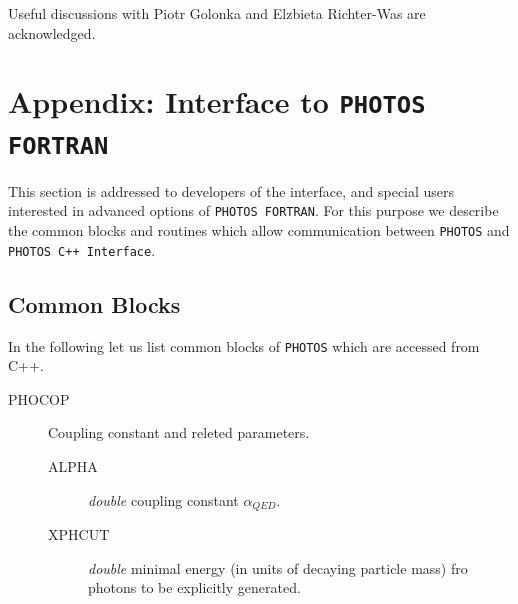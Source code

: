 \documentclass[]{Photos_interface_design}
\begin{document}
Useful discussions with Piotr Golonka and Elzbieta Richter-Was are 
acknowledged.
\newpage

{}







\newpage
\appendix

\section{Appendix: Interface to {\tt PHOTOS FORTRAN}}
\label{Interface to PHOTOS}

This section is addressed to developers of the interface, 
and special users interested in advanced options of {\tt PHOTOS FORTRAN}.
For this purpose we describe the common blocks and routines which allow
communication between {\tt PHOTOS} and {\tt PHOTOS C++ Interface}. 

\subsection{Common Blocks}

In the following let us list common blocks of {\tt PHOTOS} which are accessed
from C++.

\begin{description}
\item[PHOCOP] Coupling constant and releted parameters.
    \begin{description}
	\item[ALPHA]  \textit{double}  coupling constant $\alpha_{QED}$.
	\item[XPHCUT] \textit{double} minimal energy (in units of decaying particle mass) fro photons to be explicitly generated.
    \end{description}
\end{description}
\end{document}
